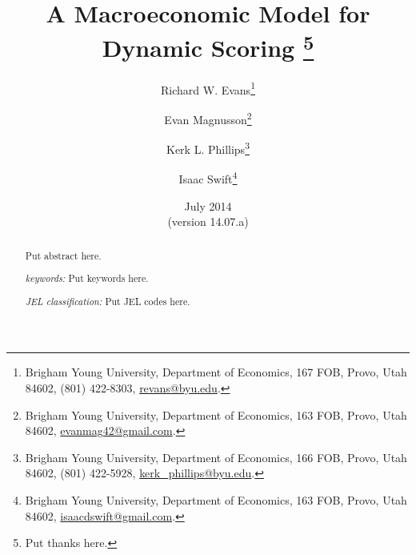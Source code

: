 \documentclass[letterpaper,12pt]{article}
\theoremstyle{definition}
\begin{document}
\begin{titlepage}
\title{A Macroeconomic Model for Dynamic Scoring
       \thanks{Put thanks here.}
       }
\author{
  Richard W. Evans\footnote{Brigham Young University, Department of Economics, 167 FOB, Provo, Utah 84602, (801) 422-8303, \href{mailto:revans@byu.edu}{revans@byu.edu}.} \\[-2pt]
  \and
  Evan Magnusson\footnote{Brigham Young University, Department of Economics, 163 FOB, Provo, Utah 84602, \href{mailto:evanmag42@gmail.com}{evanmag42@gmail.com}.} \\[-2pt]
  \and
  Kerk L. Phillips\footnote{Brigham Young University, Department of Economics, 166 FOB, Provo, Utah 84602, (801) 422-5928, \href{mailto:kerk_phillips@byu.edu}{kerk\_phillips@byu.edu}.} \\[-2pt]
  \and
  Isaac Swift\footnote{Brigham Young University, Department of Economics, 163 FOB, Provo, Utah 84602, \href{mailto:isaacdswift@gmail.com}{isaacdswift@gmail.com}.} \\[-2pt]}
\date{July 2014 \\
  \scriptsize{(version 14.07.a)}}
\maketitle
\begin{abstract}
\normalsize{Put abstract here.

\vspace{3mm}

\noindent\textit{keywords:}\: Put keywords here.

\vspace{3mm}

\noindent\textit{JEL classification:} Put JEL codes here.}
\end{abstract}
\thispagestyle{empty}
\end{titlepage}
\end{document}
